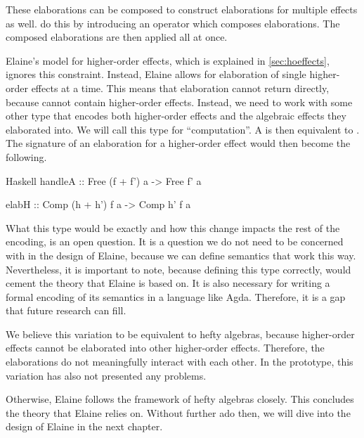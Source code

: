 These elaborations can be composed to construct elaborations for multiple effects as well. \textcite{bach_poulsen_hefty_2023} do this by introducing an operator which composes elaborations. The composed elaborations are then applied all at once.


Elaine's model for higher-order effects, which is explained in \cref{sec:hoeffects}, ignores this constraint. Instead, Elaine allows for elaboration of single higher-order effects at a time. This means that elaboration cannot return  directly, because  cannot contain higher-order effects. Instead, we need to work with some other type that encodes both higher-order effects and the algebraic effects they elaborated into. We will call this type  for ``computation''. A  is then equivalent to . The signature of an elaboration for a higher-order effect  would then become the following.

\begin{lst}{Haskell}
handleA :: Free (f + f') a
        -> Free f' a

elabH   :: Comp (h + h') f a
        -> Comp h' f a
\end{lst}
%
What this type  would be exactly and how this change impacts the rest of the encoding, is an open question. It is a question we do not need to be concerned with in the design of Elaine, because we can define semantics that work this way. Nevertheless, it is important to note, because defining this type correctly, would cement the theory that Elaine is based on. It is also necessary for writing a formal encoding of its semantics in a language like Agda. Therefore, it is a gap that future research can fill.

We believe this variation to be equivalent to hefty algebras, because higher-order effects cannot be elaborated into other higher-order effects. Therefore, the elaborations do not meaningfully interact with each other. In the prototype, this variation has also not presented any problems.


Otherwise, Elaine follows the framework of hefty algebras closely. This concludes the theory that Elaine relies on. Without further ado then, we will dive into the design of Elaine in the next chapter.
